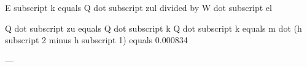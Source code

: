 E subscript k equals Q dot subscript zul divided by W dot subscript el  

Q dot subscript zu equals Q dot subscript k  
Q dot subscript k equals m dot (h subscript 2 minus h subscript 1)  
equals 0.000834  

---